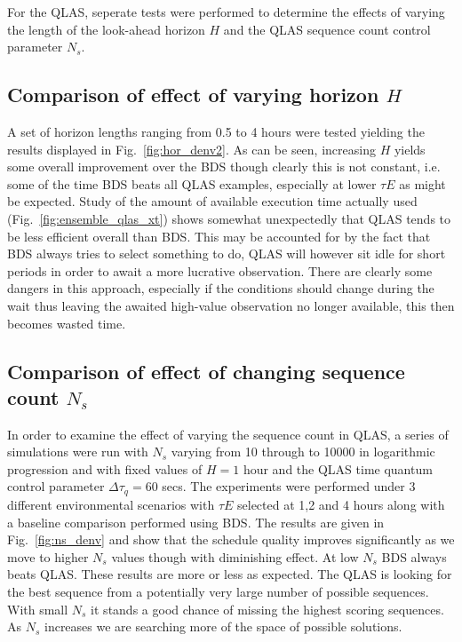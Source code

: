  For the QLAS, seperate tests were performed to determine the effects of varying the length of the look-ahead horizon $H$ and the QLAS sequence count control parameter $N_s$.


\subsection{Comparison of effect of varying horizon $H$}
A set of horizon lengths ranging from 0.5 to 4 hours were tested yielding the results displayed in Fig.~\ref{fig:hor_denv2}. As can be seen, increasing $H$ yields some overall improvement over the BDS though clearly this is not constant, i.e. some of the time BDS beats all QLAS examples, especially at lower $\tau E$ as might be expected. Study of the amount of available execution time actually used (Fig.~\ref{fig:ensemble_qlas_xt}) shows somewhat unexpectedly that QLAS tends to be less efficient overall than BDS. This may be accounted for by the fact that BDS always tries to select something to do, QLAS will however sit idle for short periods in order to await a more lucrative observation. There are clearly some dangers in this approach, especially if the conditions should change during the wait thus leaving the awaited high-value observation no longer available, this then becomes wasted time. 



\subsection{Comparison of effect of changing sequence count $N_s$} 
In order to examine the effect of varying the sequence count in QLAS, a series of simulations were run with $N_s$ varying from 10 through to 10000 in logarithmic progression and with fixed values of $H = 1$ hour and the QLAS time quantum control parameter $\Delta \tau _q = 60$ secs. The experiments were performed under 3 different environmental scenarios with $\tau E$ selected at 1,2 and 4 hours along with a baseline comparison performed using BDS. The results are given in Fig.~\ref{fig:ns_denv} and show that the schedule quality improves significantly as we move to higher $N_s$ values though with diminishing effect. At low $N_s$ BDS always beats QLAS. These results are more or less as expected. The QLAS is looking for the best sequence from a potentially very large number of possible sequences. With small $N_s$ it stands a good chance of missing  the highest scoring sequences. As $N_s$ increases we are searching more of the space of possible solutions. 


